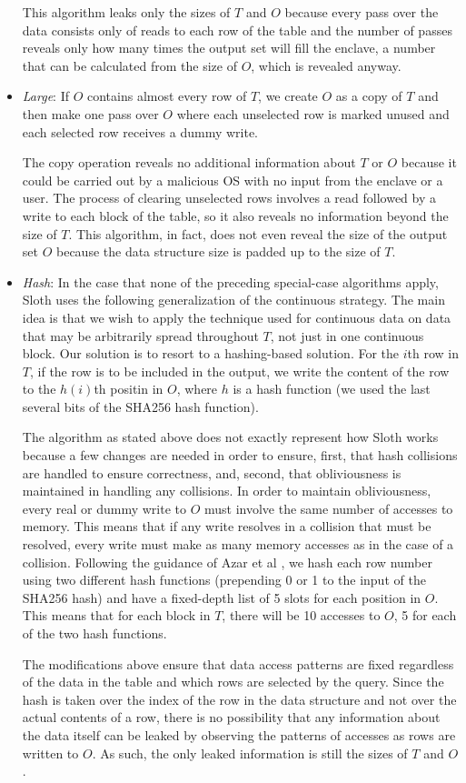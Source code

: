 \documentclass[USenglish,oneside,twocolumn]{article}
\def\name/{Sloth}
\begin{document}
\begin{itemize}
This algorithm leaks only the sizes of $T$ and $O$ because every pass over the data consists only of reads to each row of the table and the number of passes reveals only how many times the output set will fill the enclave, a number that can be calculated from the size of $O$, which is revealed anyway. 

\item \textit{Large}: If $O$ contains almost every row of $T$, we create $O$ as a copy of $T$ and then make one pass over $O$ where each unselected row is marked unused and each selected row receives a dummy write. 

The copy operation reveals no additional information about $T$ or $O$ because it could be carried out by a malicious OS with no input from the enclave or a user. The process of clearing unselected rows involves a read followed by a write to each block of the table, so it also reveals no information beyond the size of $T$. This algorithm, in fact, does not even reveal the size of the output set $O$ because the data structure size is padded up to the size of $T$. 

\item \textit{Hash}: In the case that none of the preceding special-case algorithms apply, \name/ uses the following generalization of the continuous strategy. The main idea is that we wish to apply the technique used for continuous data on data that may be arbitrarily spread throughout $T$, not just in one continuous block. Our solution is to resort to a hashing-based solution. For the $i$th row in $T$, if the row is to be included in the output, we write the content of the row to the $h(i)$th positin in $O$, where $h$ is a hash function (we used the last several bits of the SHA256 hash function).

The algorithm as stated above does not exactly represent how \name/ works because a few changes are needed in order to ensure, first, that hash collisions are handled to ensure correctness, and, second, that obliviousness is maintained in handling any collisions. In order to maintain obliviousness, every real or dummy write to $O$ must involve the same number of accesses to memory. This means that if any write resolves in a collision that must be resolved, every write must make as many memory accesses as in the case of a collision. Following the guidance of Azar et al \cite{ABKU99}, we hash each row number using two different hash functions (prepending 0 or 1 to the input of the SHA256 hash) and have a fixed-depth list of 5 slots for each position in $O$. This means that for each block in $T$, there will be 10 accesses to $O$, 5 for each of the two hash functions. 

The modifications above ensure that data access patterns are fixed regardless of the data in the table and which rows are selected by the query. Since the hash is taken over the index of the row in the data structure and not over the actual contents of a row, there is no possibility that any information about the data itself can be leaked by observing the patterns of accesses as rows are written to $O$. As such, the only leaked information is still the sizes of $T$ and $O$. 
\end{itemize}
\end{document}
